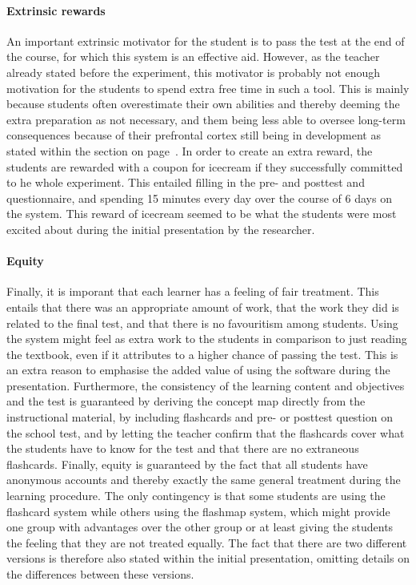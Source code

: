 \paragraph{Extrinsic rewards} An important extrinsic motivator for the student is to pass the test at the end of the course, for which this system is an effective aid. However, as the teacher already stated before the experiment, this motivator is probably not enough motivation for the students to spend extra free time in such a tool. This is mainly because students often overestimate their own abilities and thereby deeming the extra preparation as not necessary, and them being less able to oversee long-term consequences because of their prefrontal cortex still being in development as stated within the  section on page~\pageref{subsec:physiologicalcharacteristics}. In order to create an extra reward, the students are rewarded with a coupon for icecream if they successfully committed to he whole experiment. This entailed filling in the pre- and posttest and questionnaire, and spending 15 minutes every day over the course of 6 days on the system. This reward of icecream seemed to be what the students were most excited about during the initial presentation by the researcher.

\paragraph{Equity} Finally, it is imporant that each learner has a feeling of fair treatment. This entails that there was an appropriate amount of work, that the work they did is related to the final test, and that there is no favouritism among students. Using the system might feel as extra work to the students in comparison to just reading the textbook, even if it attributes to a higher chance of passing the test. This is an extra reason to emphasise the added value of using the software during the presentation. Furthermore, the consistency of the learning content and objectives and the test is guaranteed by deriving the concept map directly from the instructional material, by including flashcards and pre- or posttest question on the school test, and by letting the teacher confirm that the flashcards cover what the students have to know for the test and that there are no extraneous flashcards. Finally, equity is guaranteed by the fact that all students have anonymous accounts and thereby exactly the same general treatment during the learning procedure. The only contingency is that some students are using the flashcard system while others using the flashmap system, which might provide one group with advantages over the other group or at least giving the students the feeling that they are not treated equally. The fact that there are two different versions is therefore also stated within the initial presentation, omitting details on the differences between these versions.
